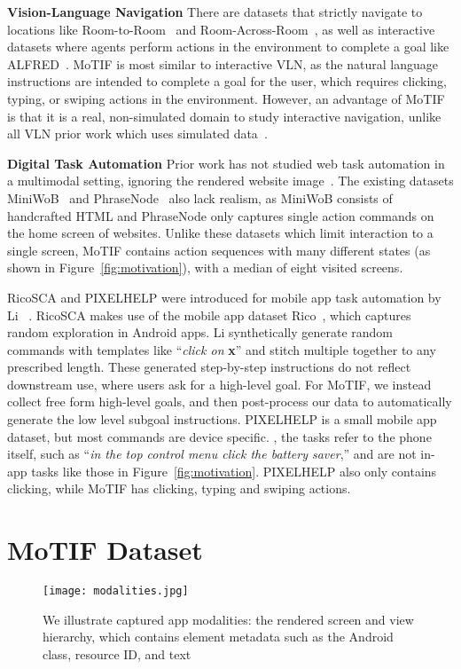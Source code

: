 \noindent\textbf{Vision-Language Navigation}
There are datasets that strictly navigate to locations like Room-to-Room~\cite{vln} and Room-Across-Room~\cite{ku-etal-2020-room}, as well as interactive datasets where agents perform actions in the environment to complete a goal like ALFRED~\cite{ALFRED20}. MoTIF is most similar to interactive VLN, as the natural language instructions are intended to complete a goal for the user, which requires clicking, typing, or swiping actions in the environment. However, an advantage of MoTIF is that it is a real, non-simulated domain to study interactive navigation, unlike all VLN prior work which uses simulated data~\cite{IQA,virtualhome8578984,ALFRED20,Zhu2017VisualSP}.
\smallskip

\noindent\textbf{Digital Task Automation}
Prior work has not studied web task automation in a multimodal setting, ignoring the rendered website image~\cite{langtoelem,wob}. The existing datasets MiniWoB~\cite{wob} and PhraseNode~\cite{langtoelem} also lack realism, as MiniWoB consists of handcrafted HTML and PhraseNode only captures single action commands on the home screen of websites. Unlike these datasets which limit interaction to a single screen, MoTIF contains action sequences with many different states (as shown in Figure~\ref{fig:motivation}), with a median of eight visited screens. 

RicoSCA and PIXELHELP were introduced for mobile app task automation by Li \etal~\cite{li-etal-2020-mapping}. RicoSCA makes use of the mobile app dataset Rico~\cite{rico}, which captures random exploration in Android apps. Li \etal\hspace{0.25mm} synthetically generate random commands with templates like ``\textit{click on} \textbf{x}'' and stitch multiple together to any prescribed length. 
These generated step-by-step instructions do not reflect downstream use, where users ask for a high-level goal. For MoTIF, we instead collect free form high-level goals, and then post-process our data to automatically generate the low level subgoal instructions.
PIXELHELP is a small mobile app dataset, but most commands are device specific. \Ie, the tasks refer to the phone itself, such as ``\textit{in the top control menu click the battery saver},'' and are not in-app tasks like those in Figure~\ref{fig:motivation}. 
PIXELHELP also only contains clicking, while MoTIF has clicking, typing and swiping actions.

\section{MoTIF Dataset}
\begin{figure}[t]
    \centering
    \texttt{[image: modalities.jpg]}
    \caption{We illustrate captured app modalities: the rendered screen and view hierarchy, which contains element metadata such as the Android class, resource ID, and text}
    \label{fig:modes}
\end{figure}

